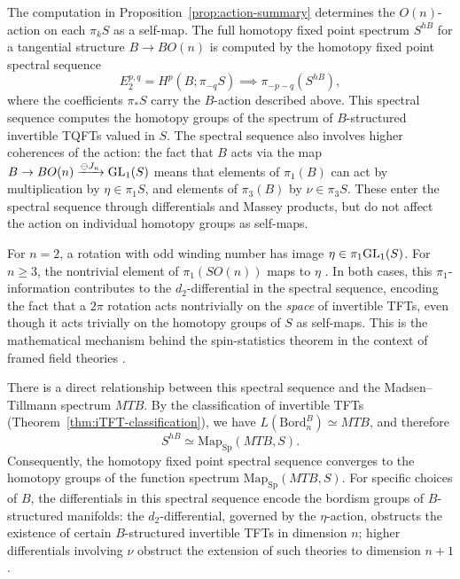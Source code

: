 \documentclass{amsart}
\begin{document}
\begin{remark}\label{rem:spectral-sequence}
The computation in Proposition~\ref{prop:action-summary} determines the $O(n)$-action on each $\pi_k S$ as a self-map. The full homotopy fixed point spectrum $S^{hB}$ for a tangential structure $B \to BO(n)$ is computed by the homotopy fixed point spectral sequence
\[
E_2^{p,q} = H^p(B; \pi_{-q} S) \implies \pi_{-p-q}(S^{hB}),
\]
where the coefficients $\pi_* S$ carry the $B$-action described above. This spectral sequence computes the homotopy groups of the spectrum of $B$-structured invertible TQFTs valued in $S$. The spectral sequence also involves higher coherences of the action: the fact that $B$ acts via the map $B \to BO(n) \xrightarrow{\ominus J_n} \mathrm{GL}_1(S)$ means that elements of $\pi_1(B)$ can act by multiplication by $\eta \in \pi_1 S$, and elements of $\pi_3(B)$ by $\nu \in \pi_3 S$. These enter the spectral sequence through differentials and Massey products, but do not affect the action on individual homotopy groups as self-maps.

For $n=2$, a rotation with odd winding number has image $\eta \in \pi_1 \mathrm{GL}_1(S)$. For $n \ge 3$, the nontrivial element of $\pi_1(SO(n))$ maps to $\eta$ \cite{adams1963groups}. In both cases, this $\pi_1$-information contributes to the $d_2$-differential in the spectral sequence, encoding the fact that a $2\pi$ rotation acts nontrivially on the \emph{space} of invertible TFTs, even though it acts trivially on the homotopy groups of $S$ as self-maps. This is the mathematical mechanism behind the spin-statistics theorem in the context of framed field theories \cite{freed2021reflection}.

There is a direct relationship between this spectral sequence and the Madsen--Tillmann spectrum $MTB$. By the classification of invertible TFTs (Theorem~\ref{thm:iTFT-classification}), we have $L(\mathrm{Bord}_n^B) \simeq MTB$, and therefore
\[
S^{hB} \simeq \mathrm{Map}_{\mathrm{Sp}}(MTB, S).
\]
Consequently, the homotopy fixed point spectral sequence converges to the homotopy groups of the function spectrum $\mathrm{Map}_{\mathrm{Sp}}(MTB, S)$. For specific choices of $B$, the differentials in this spectral sequence encode the bordism groups of $B$-structured manifolds: the $d_2$-differential, governed by the $\eta$-action, obstructs the existence of certain $B$-structured invertible TFTs in dimension $n$; higher differentials involving $\nu$ obstruct the extension of such theories to dimension $n+1$.
\end{remark}
\end{document}
